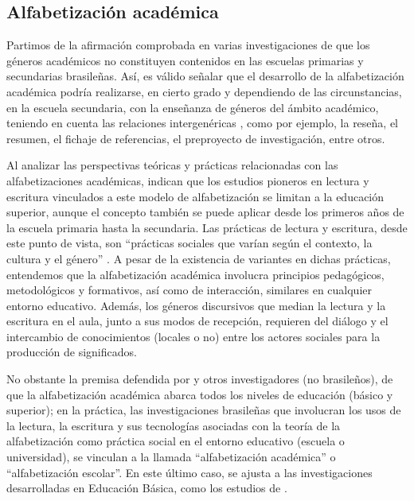 \documentclass[spanish]{textolivre}
\begin{document}
\subsection{Alfabetización académica}\label{sec-fmt-academica}
Partimos de la afirmación comprobada en varias investigaciones de que los géneros académicos no constituyen contenidos en las escuelas primarias y secundarias brasileñas. Así, es válido señalar que el desarrollo de la alfabetización académica podría realizarse, en cierto grado y dependiendo de las circunstancias, en la escuela secundaria, con la enseñanza de géneros del ámbito académico, teniendo en cuenta las relaciones intergenéricas \cite{correa_relacoes_2006}, como por ejemplo, la reseña, el resumen, el fichaje de referencias, el preproyecto de investigación, entre otros.

Al analizar las perspectivas teóricas y prácticas relacionadas con las alfabetizaciones académicas, \textcite{komesu_o_2014} indican que los estudios pioneros en lectura y escritura vinculados a este modelo de alfabetización se limitan a la educación superior, aunque el concepto también se puede aplicar desde los primeros años de la escuela primaria hasta la secundaria. Las prácticas de lectura y escritura, desde este punto de vista, son “prácticas sociales que varían según el contexto, la cultura y el género” \cite[p. 477]{komesu_o_2014}. A pesar de la existencia de variantes en dichas prácticas, entendemos que la alfabetización académica involucra principios pedagógicos, metodológicos y formativos, así como de interacción, similares en cualquier entorno educativo. Además, los géneros discursivos que median la lectura y la escritura en el aula, junto a sus modos de recepción, requieren del diálogo y el intercambio de conocimientos (locales o no) entre los actores sociales para la producción de significados.

No obstante la premisa defendida por \textcite{komesu_o_2014} y otros investigadores (no brasileños), de que la alfabetización académica abarca todos los niveles de educación (básico y superior); en la práctica, las investigaciones brasileñas que involucran los usos de la lectura, la escritura y sus tecnologías asociadas con la teoría de la alfabetización como práctica social en el entorno educativo (escuela o universidad), se vinculan a la llamada “alfabetización académica” o “alfabetización escolar”. En este último caso, se ajusta a las investigaciones desarrolladas en Educación Básica, como los estudios de \textcite{silva_pedagogia_2018, silva_plano_2020}.
\end{document}
